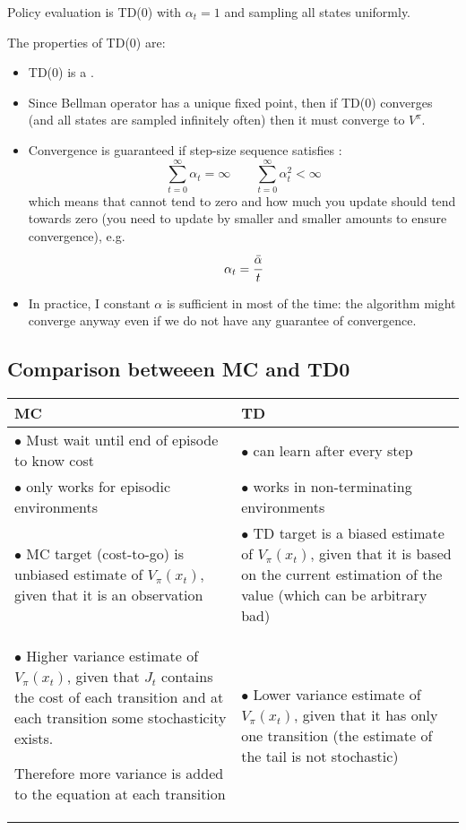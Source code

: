 Policy evaluation is TD(0) with $\alpha_t = 1$ and sampling all states uniformly.

The properties of TD(0) are:
\begin{itemize}
\item TD(0) is a .
\item Since Bellman operator has a unique fixed point, then if TD(0) converges (and all states are sampled infinitely often) then it must converge to $V^{\pi}$.
\item Convergence is guaranteed if step-size sequence satisfies :
\[\sum_{t = 0}^{\infty} \alpha_t = \infty\qquad \sum_{t = 0}^{\infty}\alpha_t^2 <\infty\]
which means that cannot tend to zero and how much you update should tend towards zero (you need to update by smaller and smaller amounts to ensure convergence), e.g.
\[\alpha_t = \cfrac{\bar{\alpha}}{t}\]
\item In practice, I constant $\alpha$ is sufficient in most of the time: the algorithm might converge anyway even if we do not have any guarantee of convergence.
\end{itemize}

\subsection{Comparison betweeen MC and TD0}
\begin{table}[!h]
\centering
\begin{tabularx}{\textwidth}{|X|X|}
\toprule
\textbf{MC}&\textbf{TD}\\
\midrule
$\bullet$ Must wait until end of episode to know cost & $\bullet$ can learn after every step\\
$\bullet$ only works for episodic environments& $\bullet$ works in non-terminating environments\\
$\bullet$ MC target (cost-to-go) is unbiased estimate of $V_{\pi}(x_t)$, given that it is an observation& $\bullet$ TD target is a biased estimate of $V_{\pi}(x_t)$, given that it is based on the current estimation of the value (which can be arbitrary bad)\\
$\bullet$ Higher variance estimate of $V_{\pi}(x_t)$, given that $J_t$ contains the cost of each transition and at each transition some stochasticity exists.

Therefore more variance is added to the equation at each transition & $\bullet$ Lower variance estimate of $V_{\pi}(x_t)$, given that it has only one transition (the estimate of the tail is not stochastic)\\
\bottomrule
\end{tabularx}
\end{table}

